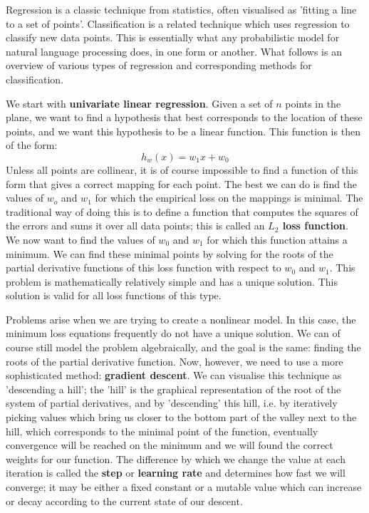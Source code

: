     Regression is a classic technique from statistics, often visualised as
    'fitting a line to a set of points'. Classification is a related
    technique which uses regression to classify new data points. This is
    essentially what any probabilistic model for natural language
    processing does, in one form or another. What follows is an overview
    of various types of regression and corresponding methods for
    classification.

    We start with \textbf{univariate linear regression}. Given a set
    of $n$ points in the plane, we want to find a hypothesis that best
    corresponds to the location of these points, and we want this
    hypothesis to be a linear function. This function is then of the form:
    \begin{equation}
      h_w(x) = w_1x + w_0
    \end{equation}
    Unless all points are collinear, it is of course impossible to
    find a function of this form that gives a correct mapping for each
    point. The best we can do is find the values of $w_o$ and $w_1$ for
    which the empirical loss on the mappings is minimal. The traditional
    way of doing this is to define a function that computes the squares of
    the errors and sums it over all data points; this is called an
    \textbf{$L_2$ loss function}. We now want to find the values of $w_0$
    and $w_1$ for which this function attains a minimum. We can find these
    minimal points by solving for the roots of the partial derivative
    functions of this loss function with respect to $w_0$ and $w_1$.  This
    problem is mathematically relatively simple and has a unique
    solution. This solution is valid for all loss functions of this type.

    Problems arise when we are trying to create a nonlinear model. In
    this case, the minimum loss equations frequently do not have a unique
    solution. We can of course still model the problem algebraically, and
    the goal is the same: finding the roots of the partial derivative
    function. Now, however, we need to use a more sophisticated method:
    \textbf{gradient descent}. We can visualise this technique as
    'descending a hill'; the 'hill' is the graphical representation of the
    root of the system of partial derivatives, and by 'descending' this
    hill, i.e. by iteratively picking values which bring us closer to the
    bottom part of the valley next to the hill, which corresponds to the
    minimal point of the function, eventually convergence will be reached
    on the minimum and we will found the correct weights for our
    function. The difference by which we change the value at each
    iteration is called the \textbf{step} or \textbf{learning rate} and
    determines how fast we will converge; it may be either a fixed
    constant or a mutable value which can increase or decay according to
    the current state of our descent.

